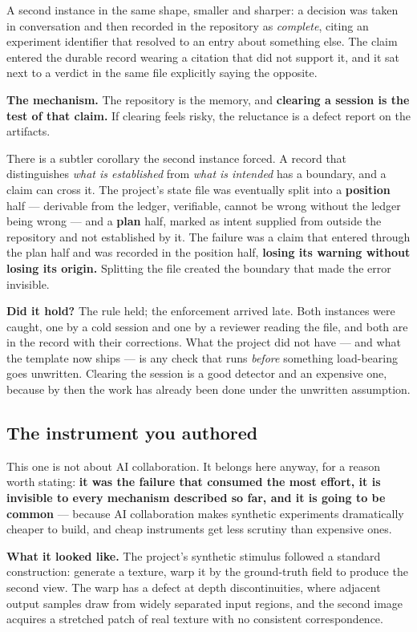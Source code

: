 A second instance in the same shape, smaller and sharper: a decision was taken in conversation and then recorded in the repository as \textit{complete}, citing an experiment identifier that resolved to an entry about something else. The claim entered the durable record wearing a citation that did not support it, and it sat next to a verdict in the same file explicitly saying the opposite.

\textbf{The mechanism.} The repository is the memory, and \textbf{clearing a session is the test of that claim.} If clearing feels risky, the reluctance is a defect report on the artifacts.

There is a subtler corollary the second instance forced. A record that distinguishes \textit{what is established} from \textit{what is intended} has a boundary, and a claim can cross it. The project's state file was eventually split into a \textbf{position} half --- derivable from the ledger, verifiable, cannot be wrong without the ledger being wrong --- and a \textbf{plan} half, marked as intent supplied from outside the repository and not established by it. The failure was a claim that entered through the plan half and was recorded in the position half, \textbf{losing its warning without losing its origin.} Splitting the file created the boundary that made the error invisible.

\textbf{Did it hold?} The rule held; the enforcement arrived late. Both instances were caught, one by a cold session and one by a reviewer reading the file, and both are in the record with their corrections. What the project did not have --- and what the template now ships --- is any check that runs \textit{before} something load-bearing goes unwritten. Clearing the session is a good detector and an expensive one, because by then the work has already been done under the unwritten assumption.

\subsection{The instrument you authored}

This one is not about AI collaboration. It belongs here anyway, for a reason worth stating: \textbf{it was the failure that consumed the most effort, it is invisible to every mechanism described so far, and it is going to be common} --- because AI collaboration makes synthetic experiments dramatically cheaper to build, and cheap instruments get less scrutiny than expensive ones.

\textbf{What it looked like.} The project's synthetic stimulus followed a standard construction: generate a texture, warp it by the ground-truth field to produce the second view. The warp has a defect at depth discontinuities, where adjacent output samples draw from widely separated input regions, and the second image acquires a stretched patch of real texture with no consistent correspondence.

